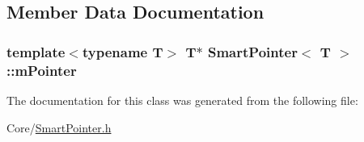 \subsection{Member Data Documentation}
\subsubsection[{\texorpdfstring{m\+Pointer}{mPointer}}]{\setlength{\rightskip}{0pt plus 5cm}template$<$typename T$>$ T$\ast$ {\bf Smart\+Pointer}$<$ T $>$\+::m\+Pointer\hspace{0.3cm}{\ttfamily [private]}}\hypertarget{classSmartPointer_a60e9c1027c474fd7275605808e5876d9}{}\label{classSmartPointer_a60e9c1027c474fd7275605808e5876d9}


The documentation for this class was generated from the following file\+:\begin{DoxyCompactItemize}
\item 
Core/\hyperlink{SmartPointer_8h}{Smart\+Pointer.\+h}\end{DoxyCompactItemize}
